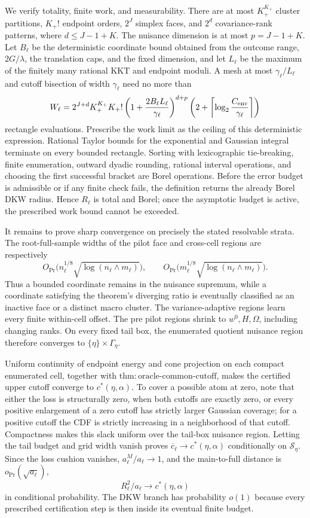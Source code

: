We verify totality, finite work, and measurability.  There are at most
\(K_+^{K_+}\) cluster partitions, \(K_+!\) endpoint orders, \(2^J\) simplex faces, and \(2^d\) covariance-rank patterns, where
\(d\leq J-1+K\).  The nuisance dimension is at most \(p=J-1+K\).  Let \(B_\ell\) be the deterministic coordinate bound obtained from the outcome range, \(2G/\lambda\), the translation caps, and the fixed dimension, and let \(L_\ell\) be the maximum of the finitely many rational KKT and endpoint moduli.  A mesh at most \(\gamma_\ell/L_\ell\) and cutoff bisection of width \(\gamma_\ell\) need no more than
\[
 W_\ell=
 2^{J+d}K_+^{K_+}K_+!
 \left(1+\frac{2B_\ell L_\ell}{\gamma_\ell}\right)^{d+p}
 \left(2+\left\lceil\log_2\frac{C_{\rm env}}{\gamma_\ell}\right\rceil\right)
\]
rectangle evaluations.  Prescribe the work limit as the ceiling of this deterministic expression.  Rational Taylor bounds for the exponential and Gaussian integral terminate on every bounded rectangle.  Sorting with lexicographic tie-breaking, finite enumeration, outward dyadic rounding, rational interval operations, and choosing the first successful bracket are Borel operations.  Before the error budget is admissible or if any finite check fails, the definition returns the already Borel DKW radius.  Hence \(R_\ell\) is total and Borel; once the asymptotic budget is active, the prescribed work bound cannot be exceeded.

It remains to prove sharp convergence on precisely the stated resolvable strata.  The root-full-sample widths of the pilot face and cross-cell regions are respectively
\[
 O_{\Pr}\bigl(n_\ell^{1/8}\sqrt{\log(n_\ell\wedge m_\ell)}\bigr),
 \qquad
 O_{\Pr}\bigl(m_\ell^{1/8}\sqrt{\log(n_\ell\wedge m_\ell)}\bigr).
\]
Thus a bounded coordinate remains in the nuisance supremum, while a coordinate satisfying the theorem's diverging ratio is eventually classified as an inactive face or a distinct macro cluster.  The variance-adaptive regions learn every finite within-cell offset.  The pre pilot regions shrink to \(w^0,H,\Omega\), including changing ranks.  On every fixed tail box, the enumerated quotient nuisance region therefore converges to \(\{\eta\}\times\Gamma_\eta\).

Uniform continuity of endpoint energy and cone projection on each compact enumerated cell, together with
\(\mathrm{thm:oracle\mbox{-}common\mbox{-}cutoff}\), makes the certified upper cutoff converge to \(c^*(\eta,\alpha)\).  To cover a possible atom at zero, note that either the loss is structurally zero, when both cutoffs are exactly zero, or every positive enlargement of a zero cutoff has strictly larger Gaussian coverage; for a positive cutoff the CDF is strictly increasing in a neighborhood of that cutoff.  Compactness makes this slack uniform over the tail-box nuisance region.  Letting the tail budget and grid width vanish proves
\(\overline c_\ell\to c^*(\eta,\alpha)\) conditionally on \(\mathscr S_\eta\).  Since the loss cushion vanishes, \(a^M_\ell/a_\ell\to1\), and the main-to-full distance is \(o_{\Pr}(\sqrt{a_\ell})\),
\[
 R_\ell^2/a_\ell\longrightarrow c^*(\eta,\alpha)
\]
in conditional probability.  The DKW branch has probability \(o(1)\) because every prescribed certification step is then inside its eventual finite budget.


